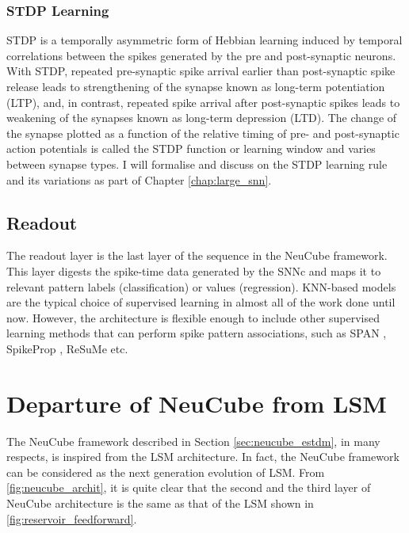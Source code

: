\subsubsection{STDP Learning}

STDP is a temporally asymmetric form of Hebbian learning induced by temporal correlations between the spikes generated by the pre and post-synaptic neurons. With STDP, repeated pre-synaptic spike arrival earlier than post-synaptic spike release leads to strengthening of the synapse known as long-term potentiation (LTP), and, in contrast, repeated spike arrival after post-synaptic spikes leads to weakening of the synapses known as long-term depression (LTD). The change of the synapse plotted as a function of the relative timing of pre- and post-synaptic action potentials is called the STDP function or learning window and varies between synapse types. I will formalise and discuss on the STDP learning rule and its variations as part of Chapter \ref{chap:large_snn}. 


\subsection{Readout}

The readout layer is the last layer of the sequence in the NeuCube framework. This layer digests the spike-time data generated by the SNNc and maps it to relevant pattern labels (classification) or values (regression). KNN-based models \citep{kasabov2013dynamic} are the typical choice of supervised learning in almost all of the work done until now. However, the architecture is flexible enough to include other supervised learning methods that can perform spike pattern associations, such as SPAN \citep{mohemmed2012span}, SpikeProp \citep{schrauwen2004extending}, ReSuMe \citep{ponulak2010supervised} etc.

\section{Departure of NeuCube from LSM}

The NeuCube framework described in Section \ref{sec:neucube_estdm}, in many respects, is inspired from the LSM architecture. In fact, the NeuCube framework can be considered as the next generation evolution of LSM. From \figurename \ref{fig:neucube_archit}, it is quite clear that the second and the third layer of NeuCube architecture is the same as that of the LSM shown in \figurename \ref{fig:reservoir_feedforward}. 

